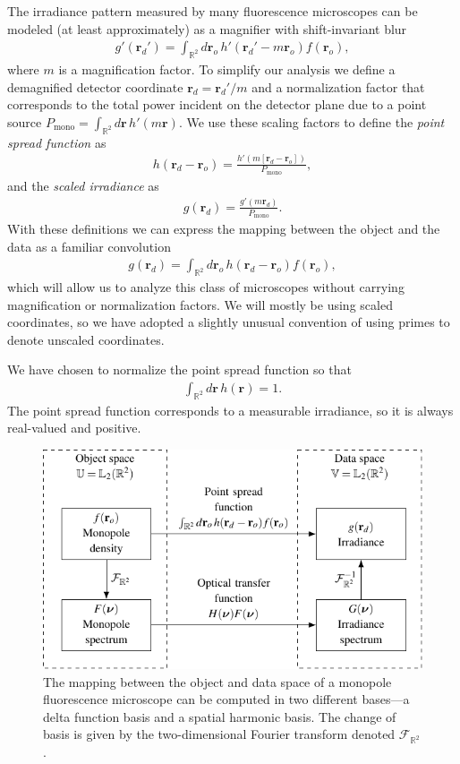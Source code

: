 \documentclass[]{osa-article}
\providecommand{\mb}[1]{\mathbf{#1}}
\providecommand{\ro}{\mathbf{\mathbf{r}}_o}
\providecommand{\rd}{\mathbf{r}_d}
\providecommand{\mbb}[1]{\mathbb{#1}}
\begin{document}
The irradiance pattern measured by many fluorescence microscopes can be modeled
(at least approximately) as a magnifier with shift-invariant blur
\begin{align}
  g'(\rd') = \int_{\mbb{R}^2}d\ro\, h'(\rd' - m\ro)f(\ro), 
\end{align}
where $m$ is a magnification factor. To simplify our analysis we define a
demagnified detector coordinate $\rd = \rd'/m$ and a normalization factor that
corresponds to the total power incident on the detector plane due to a point
source $P_{\text{mono}} = \int_{\mbb{R}^2}d\mb{r}\,h'(m\mb{r})$. We use these scaling
factors to define the \textit{point spread function} as
\begin{align}
  h(\rd - \ro) = \frac{h'(m[\rd - \ro])}{P_{\text{mono}}},
\end{align}
and the \textit{scaled irradiance} as
\begin{align}
  g(\rd) = \frac{g'(m\rd)}{P_{\text{mono}}}.
\end{align}
With these definitions we can express the mapping between the object and the
data as a familiar convolution
\begin{align}
  g(\rd) = \int_{\mbb{R}^2}d\ro\, h(\rd - \ro)f(\ro),  \label{eq:lsi}
\end{align}
which will allow us to analyze this class of microscopes without carrying
magnification or normalization factors. We will mostly be using scaled
coordinates, so we have adopted a slightly unusual convention of using primes to
denote unscaled coordinates.

We have chosen to normalize the point spread function so that
\begin{align}
  \int_{\mbb{R}^2}d\mb{r}\, h(\mb{r}) = 1. \label{eq:norm}
\end{align}
The point spread function corresponds to a measurable irradiance, so it is
always real-valued and positive.

\begin{figure}
  \centering
  \includegraphics[scale=1.0]{../figures/monopole-block/monopole-block.pdf}
  \caption{The mapping between the object and data space of a monopole
    fluorescence microscope can be computed in two different bases---a delta
    function basis and a spatial harmonic basis. The change of basis is given by
    the two-dimensional Fourier transform denoted $\mathcal{F}_{\mbb{R}^2}$.}
     \label{fig:monopole-block}      
\end{figure}
\end{document}
